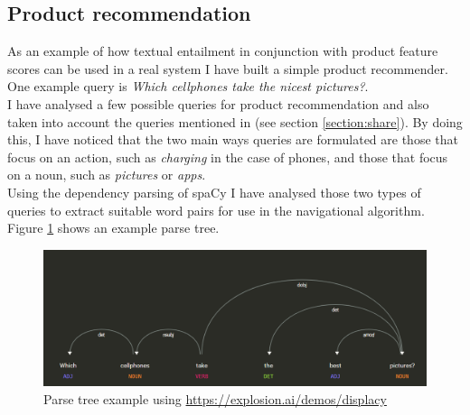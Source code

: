 \subsection{Product recommendation}
\label{sec:product-recommendation}
As an example of how textual entailment in conjunction with product feature scores can be used in a real system I have built a simple product recommender. One example query is \textit{Which cellphones take the nicest pictures?}.\\
I have analysed a few possible queries for product recommendation and also taken into account the queries mentioned in \cite{mostefai2005effective} (see section \ref{section:share}). By doing this, I have noticed that the two main ways queries are formulated are those that focus on an action, such as \textit{charging} in the case of phones, and those that focus on a noun, such as \textit{pictures} or \textit{apps}.\\
Using the dependency parsing of spaCy I have analysed those two types of queries to extract suitable word pairs for use in the navigational algorithm. Figure \ref{fig:dep-example} shows an example parse tree.
\begin{figure}[H]
    \centering
    \includegraphics[scale=0.5]{fig/dep-example.PNG}
    \caption{Parse tree example using \url{https://explosion.ai/demos/displacy}}
    \label{fig:dep-example}
\end{figure}

